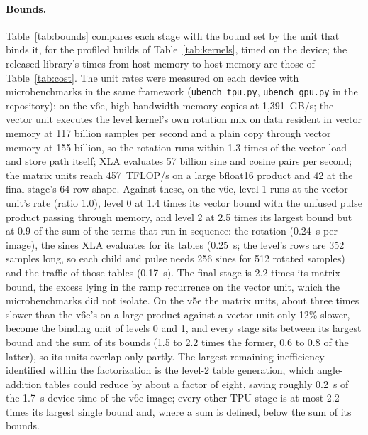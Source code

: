 \documentclass[11pt]{article}
\begin{document}
\paragraph{Bounds.} Table~\ref{tab:bounds} compares each stage with the bound set by the unit that binds it, for the profiled builds of Table~\ref{tab:kernels}, timed on the device; the released library's times from host memory to host memory are those of Table~\ref{tab:cost}. The unit rates were measured on each device with microbenchmarks in the same framework (\texttt{ubench\_tpu.py}, \texttt{ubench\_gpu.py} in the repository): on the v6e, high-bandwidth memory copies at 1,391~GB/s; the vector unit executes the level kernel's own rotation mix on data resident in vector memory at 117 billion samples per second and a plain copy through vector memory at 155 billion, so the rotation runs within 1.3 times of the vector load and store path itself; XLA evaluates 57 billion sine and cosine pairs per second; the matrix units reach 457~TFLOP/s on a large bfloat16 product and 42 at the final stage's 64-row shape. Against these, on the v6e, level 1 runs at the vector unit's rate (ratio 1.0), level 0 at 1.4 times its vector bound with the unfused pulse product passing through memory, and level 2 at 2.5 times its largest bound but at 0.9 of the sum of the terms that run in sequence: the rotation (0.24~s per image), the sines XLA evaluates for its tables (0.25~s; the level's rows are 352 samples long, so each child and pulse needs 256 sines for 512 rotated samples) and the traffic of those tables (0.17~s). The final stage is 2.2 times its matrix bound, the excess lying in the ramp recurrence on the vector unit, which the microbenchmarks did not isolate. On the v5e the matrix units, about three times slower than the v6e's on a large product against a vector unit only 12\% slower, become the binding unit of levels 0 and 1, and every stage sits between its largest bound and the sum of its bounds (1.5 to 2.2 times the former, 0.6 to 0.8 of the latter), so its units overlap only partly. The largest remaining inefficiency identified within the factorization is the level-2 table generation, which angle-addition tables could reduce by about a factor of eight, saving roughly 0.2~s of the 1.7~s device time of the v6e image; every other TPU stage is at most 2.2 times its largest single bound and, where a sum is defined, below the sum of its bounds.
\end{document}
